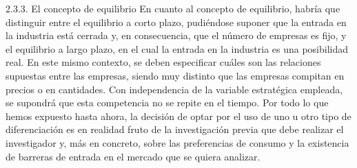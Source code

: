 \documentclass[10pt,a4paper]{article}
\begin{document}
2.3.3. El concepto de equilibrio
En cuanto al concepto de equilibrio, habría que distinguir entre el equilibrio a corto plazo, pudiéndose suponer que la entrada en la industria está cerrada y, en consecuencia, que el número de empresas es fijo, y el equilibrio a largo plazo, en el cual la entrada en la industria es una posibilidad real. 
En este mismo contexto, se deben especificar cuáles son las relaciones supuestas entre las empresas, siendo muy distinto que las empresas compitan en precios o en cantidades. Con independencia de la variable estratégica empleada, se supondrá que esta competencia no se repite en el tiempo.
Por todo lo que hemos expuesto hasta ahora, la decisión de optar por el uso de uno u otro tipo de diferenciación es en realidad fruto de la investigación previa que debe realizar el investigador y, más en concreto, sobre las preferencias de consumo y la existencia de barreras de entrada en el mercado que se quiera analizar. 

\clearpage
\end{document}
